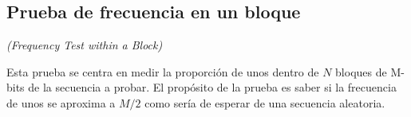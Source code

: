 


\subsection{Prueba de frecuencia en un bloque} %
\textit{(Frequency Test within a Block)}

Esta prueba se centra en medir la proporción de unos dentro de $N$ bloques de
M-bits de la secuencia a probar. El propósito de la prueba es saber si la
frecuencia de unos se aproxima a $M/2$ como sería de esperar de una secuencia
aleatoria.


